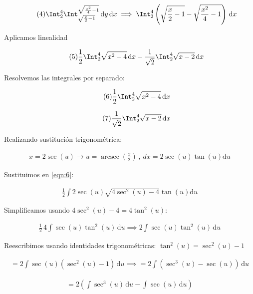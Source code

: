 \documentclass[12pt]{article}
\DeclareMathOperator{\arcsec}{arcsec}
\begin{document}
\begin{equation}\tag{4}
	\Int_2^4 \Int_{\sqrt{\frac{x}{2}-1}}^{\sqrt{\frac{x^2}{4}-1}} \, \mathrm{d}y \,\mathrm{d}x \implies \Int_2^4 \left(\sqrt{\frac{x}{2}-1} - \sqrt{\frac{x^2}{4}-1}\right)\, \mathrm{d}x
\end{equation}

\noindent Aplicamos linealidad

\begin{equation}\label{eqn:5}\tag{5}
	\frac{1}{2} \Int_2^4 \sqrt{x^2-4}\, \mathrm{d}x - \frac{1}{\sqrt{2}} \Int_2^4 \sqrt{x-2}\, \mathrm{d}x
\end{equation}

\noindent Resolvemos las integrales por separado:

\begin{equation}\label{eqn:6}\tag{6}
	\frac{1}{2} \Int_2^4 \sqrt{x^2-4}\, \mathrm{d}x
\end{equation}

\begin{equation}\label{eqn:7}\tag{7}
	\frac{1}{\sqrt{2}} \Int_2^4 \sqrt{x-2}\, \mathrm{d}x
\end{equation}

\noindent Realizando sustitución trigonométrica:

\begin{align*}
	x = 2 \sec(u) \to u = \arcsec(\frac{x}{2})\, , \ dx=2\sec(u)\tan(u) \mathrm{d}u
\end{align*}

\noindent Sustituimos en \eqref{eqn:6}:

\begin{align*}
	\frac{1}{2} \int 2\sec(u)\sqrt{4\sec^2(u)-4}\tan(u) \mathrm{d}u
\end{align*}

\noindent Simplificamos usando $4\sec^2(u)-4 = 4\tan^2(u)$:

\begin{align*}
	\frac{1}{2}\, 4\int \sec(u)\tan^2(u)\, \mathrm{d}u \implies 2\int \sec(u)\tan^2(u)\, \mathrm{d}u
\end{align*}

\noindent Reescribimos usando identidades trigonométricas: $\tan^2(u)=\sec^2(u)-1$

\begin{align*}
	= 2\int \sec(u)(\sec^2(u)-1)\, \mathrm{d}u \implies = 2\int (\sec^3(u)-\sec(u))\, \mathrm{d}u
\end{align*}

\begin{align*}
	= 2\left(\int \sec^3(u)\, \mathrm{d}u - \int \sec(u)\, \mathrm{d}u\right)
\end{align*}
\end{document}
